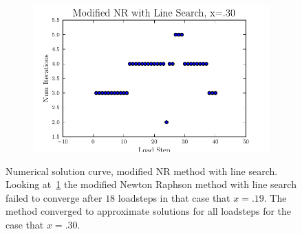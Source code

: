 \documentclass[10pt,letterpaper]{article}
\begin{document}
\begin{figure}[!tbh]
\begin{subfigure}[b]{.6\textwidth}
    \caption{}
    \label{fig4:label:c}
  \end{subfigure}
  \hfill
  \begin{subfigure}[b]{.6\textwidth}
    \includegraphics[width=\textwidth]{moded_nr_wls_x30_conv.pdf}
    \caption{}
    \label{fig4:label:d}
  \end{subfigure}
    \caption{Numerical solution curve, modified NR method with line search. Looking at~\ref{fig4:label:c} the modified Newton Raphson method with line search failed to converge after $18$ loadsteps in that case that $x=.19$. The method converged to approximate solutions for all loadsteps for the case that $x=.30$.
 }
\end{figure}
\end{document}

